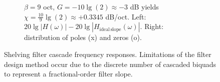 \begin{figure}
\begin{subfigure}{0.8\textwidth}
\caption{$\beta=9$ oct,
$G=-10\lg(2)\approx -3$ dB yields
$\chi =  \frac{10}{9}\lg(2) \approx + 0.3345$ dB/oct.
Left: $20\lg|H(\omega)|-20\lg|H_\mathrm{ideal\,slope}(\omega)|$.
Right: distribution of poles (x) and zeros (o).}
\label{fig:ripple-and-zp-frequency}
\end{subfigure}
%
\caption{Shelving filter cascade frequency responses.
%
Limitations of the filter design method occur due to the discrete number of
cascaded biquads to represent a fractional-order filter slope.
}
\label{fig:shelving_filter_error_cases}
\end{figure}
